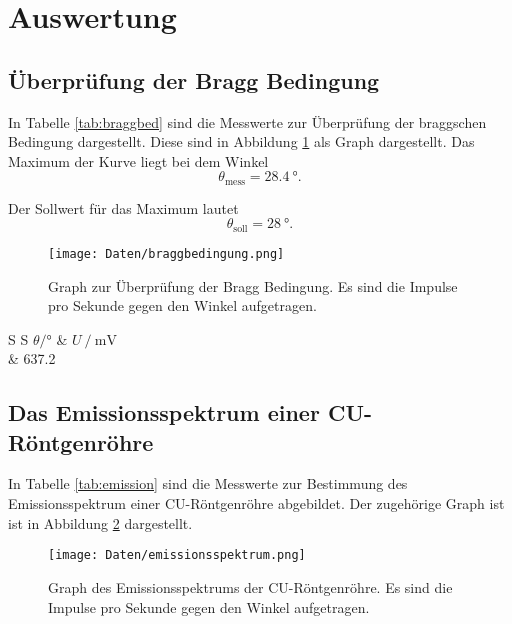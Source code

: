 \section{Auswertung}
\label{sec:Auswertung}

\subsection{Überprüfung der Bragg Bedingung}

In Tabelle \ref{tab:braggbed} sind die Messwerte zur Überprüfung der braggschen
Bedingung dargestellt. Diese sind in Abbildung \ref{fig:braggbed} als Graph dargestellt.
Das Maximum der Kurve liegt bei dem Winkel
\begin{equation}
  \theta_\text{mess} = \SI{28.4}{\degree}.
\end{equation}

Der Sollwert für das Maximum lautet
\begin{equation}
  \theta_\text{soll} = \SI{28}{\degree}.
\end{equation}

\begin{figure}
  \centering
  \texttt{[image: Daten/braggbedingung.png]}
  \caption{Graph zur Überprüfung der Bragg Bedingung. Es sind die Impulse pro
  Sekunde gegen den Winkel aufgetragen.}
  \label{fig:braggbed}
\end{figure}

\begin{table}[h]
  \centering
  \begin{tabular}{S S}
    \toprule
    {$\theta/\si{\degree}$} & {$U\:/\:\si{\milli\volt}$}\\
     & 637.2\\
    \bottomrule
  \end{tabular}
  \caption{Messwerte zur Überprüfung der Bragg Bedingung.}
  \label{tab:braggbed}
\end{table}

\subsection{Das Emissionsspektrum einer CU-Röntgenröhre}

In Tabelle \ref{tab:emission} sind die Messwerte zur Bestimmung des
Emissionsspektrum einer CU-Röntgenröhre abgebildet. Der zugehörige Graph ist
ist in Abbildung \ref{fig:emission} dargestellt.

\begin{figure}
  \centering
  \texttt{[image: Daten/emissionsspektrum.png]}
  \caption{Graph des Emissionsspektrums der CU-Röntgenröhre. Es sind die
  Impulse pro Sekunde gegen den Winkel aufgetragen.}
  \label{fig:emission}
\end{figure}

